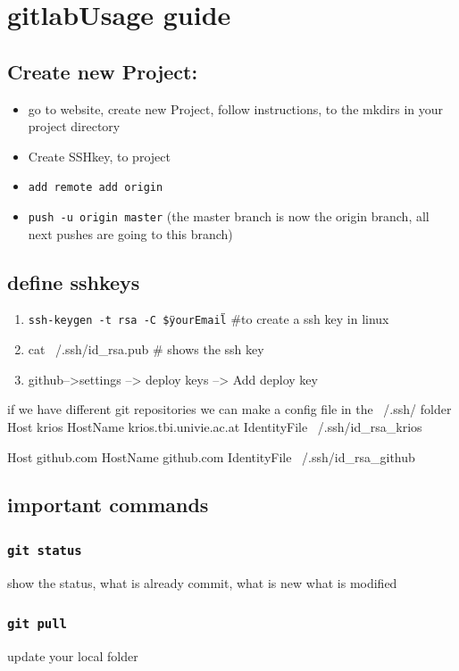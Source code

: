 \documentclass[ twoside,openright,titlepage,numbers=noenddot,headinclude,%
                footinclude=true, cleardoublepage=empty,abstractoff, %
                BCOR=5mm,paper=a4,fontsize=11pt,%
                ]{scrreprt}
\begin{document}
\chapter{gitlabUsage guide}
\section{Create new Project:}

\begin{itemize}
	\item go to website, create new Project, follow instructions, to the mkdirs in  your project directory
	\item Create SSHkey, to project
	\item \texttt{add remote add origin}
	\item \texttt{push -u origin master}    (the master branch is now the origin branch, all next pushes are going to this branch)
\end{itemize}

\section{define sshkeys}

\begin{enumerate}
\item \texttt{ssh-keygen -t rsa -C \"\$yourEmail\"} \#to create a ssh key in linux
\item cat ~/.ssh/id\_rsa.pub   \# shows the ssh key
\item github-->settings --> deploy keys --> Add deploy key
\end{enumerate}

if we have different git repositories we can make a config file in the 
~/.ssh/ folder
Host krios
HostName krios.tbi.univie.ac.at
IdentityFile ~/.ssh/id\_rsa\_krios

Host github.com
HostName github.com
IdentityFile ~/.ssh/id\_rsa\_github




\section{important commands}
\subsection{\texttt{git status}}
	show the status, what is already commit, what is new what is modified
\subsection{\texttt{git pull}}
	update your local folder
\end{document}
